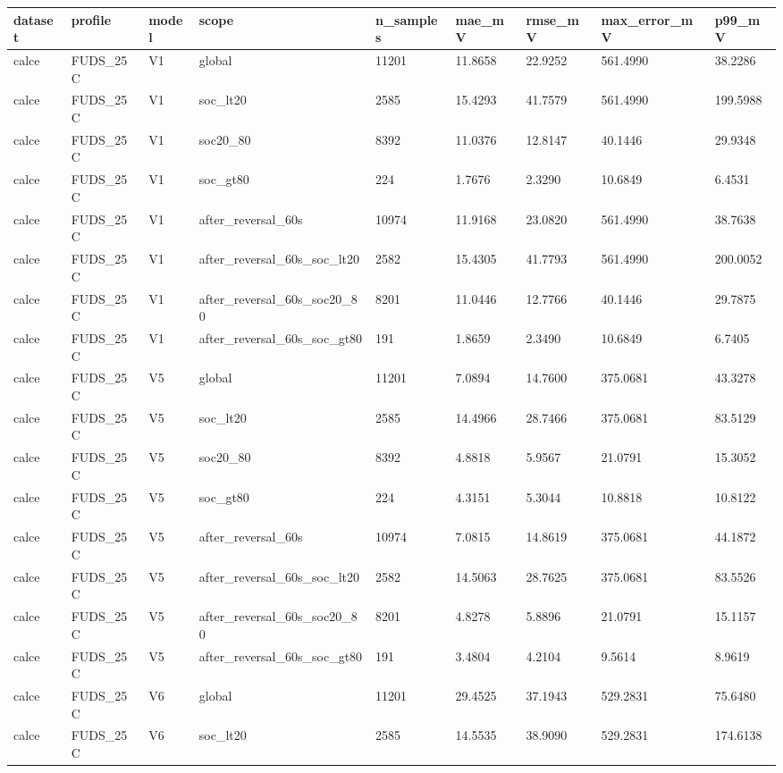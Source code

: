 \begin{tabular}{lllllllll}
\hline
dataset & profile & model & scope & n\_samples & mae\_mV & rmse\_mV & max\_error\_mV & p99\_mV \\
\hline
calce & FUDS\_25C & V1 & global & 11201 & 11.8658 & 22.9252 & 561.4990 & 38.2286 \\
calce & FUDS\_25C & V1 & soc\_lt20 & 2585 & 15.4293 & 41.7579 & 561.4990 & 199.5988 \\
calce & FUDS\_25C & V1 & soc20\_80 & 8392 & 11.0376 & 12.8147 & 40.1446 & 29.9348 \\
calce & FUDS\_25C & V1 & soc\_gt80 & 224 & 1.7676 & 2.3290 & 10.6849 & 6.4531 \\
calce & FUDS\_25C & V1 & after\_reversal\_60s & 10974 & 11.9168 & 23.0820 & 561.4990 & 38.7638 \\
calce & FUDS\_25C & V1 & after\_reversal\_60s\_soc\_lt20 & 2582 & 15.4305 & 41.7793 & 561.4990 & 200.0052 \\
calce & FUDS\_25C & V1 & after\_reversal\_60s\_soc20\_80 & 8201 & 11.0446 & 12.7766 & 40.1446 & 29.7875 \\
calce & FUDS\_25C & V1 & after\_reversal\_60s\_soc\_gt80 & 191 & 1.8659 & 2.3490 & 10.6849 & 6.7405 \\
calce & FUDS\_25C & V5 & global & 11201 & 7.0894 & 14.7600 & 375.0681 & 43.3278 \\
calce & FUDS\_25C & V5 & soc\_lt20 & 2585 & 14.4966 & 28.7466 & 375.0681 & 83.5129 \\
calce & FUDS\_25C & V5 & soc20\_80 & 8392 & 4.8818 & 5.9567 & 21.0791 & 15.3052 \\
calce & FUDS\_25C & V5 & soc\_gt80 & 224 & 4.3151 & 5.3044 & 10.8818 & 10.8122 \\
calce & FUDS\_25C & V5 & after\_reversal\_60s & 10974 & 7.0815 & 14.8619 & 375.0681 & 44.1872 \\
calce & FUDS\_25C & V5 & after\_reversal\_60s\_soc\_lt20 & 2582 & 14.5063 & 28.7625 & 375.0681 & 83.5526 \\
calce & FUDS\_25C & V5 & after\_reversal\_60s\_soc20\_80 & 8201 & 4.8278 & 5.8896 & 21.0791 & 15.1157 \\
calce & FUDS\_25C & V5 & after\_reversal\_60s\_soc\_gt80 & 191 & 3.4804 & 4.2104 & 9.5614 & 8.9619 \\
calce & FUDS\_25C & V6 & global & 11201 & 29.4525 & 37.1943 & 529.2831 & 75.6480 \\
calce & FUDS\_25C & V6 & soc\_lt20 & 2585 & 14.5535 & 38.9090 & 529.2831 & 174.6138 \\

\end{tabular}
